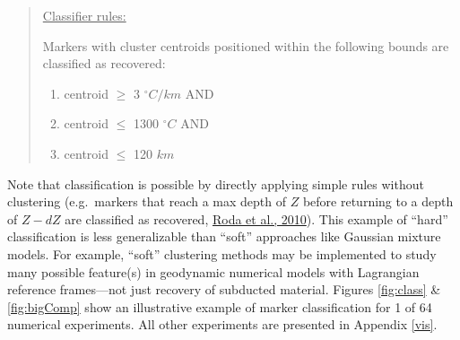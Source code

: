 \begin{quote}
\uline{Classifier rules:}

Markers with cluster centroids positioned within the following bounds are classified as recovered:

\begin{enumerate}
\def\labelenumi{\arabic{enumi}.}
\tightlist
\item
  centroid \(\geq\) 3 \(^\circ C/km\) AND
\item
  centroid \(\leq\) 1300 \(^\circ C\) AND
\item
  centroid \(\leq\) 120 \(km\)
\end{enumerate}
\end{quote}

Note that classification is possible by directly applying simple rules without clustering (e.g.~markers that reach a max depth of \(Z\) before returning to a depth of \(Z-dZ\) are classified as recovered, \protect\hyperlink{ref-roda2010}{Roda et al., 2010}). This example of ``hard'' classification is less generalizable than ``soft'' approaches like Gaussian mixture models. For example, ``soft'' clustering methods may be implemented to study many possible feature(s) in geodynamic numerical models with Lagrangian reference frames---not just recovery of subducted material. Figures \ref{fig:class} \& \ref{fig:bigComp} show an illustrative example of marker classification for 1 of 64 numerical experiments. All other experiments are presented in Appendix \ref{vis}.



